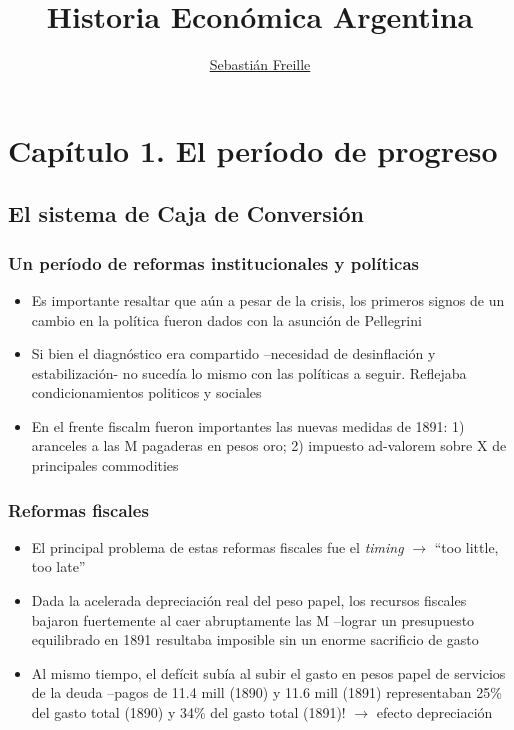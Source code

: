 \documentclass[14pt,aspectratio=169]{beamer}
\title{Historia Económica Argentina}
\author{\underline{Sebastián Freille} \inst{1}}
\institute[shortinst]{\inst{1} IEF-UNC \\ UCC}
\date{}
\begin{document}
{
  \begin{frame}
    \titlepage
  \end{frame}
}

  
  \section{Capítulo 1. El período de progreso}

  \subsection{El sistema de Caja de Conversión}


   \begin{frame}\frametitle{Un período de reformas institucionales y políticas}
    \begin{itemize}\itemsep 10pt
      \item Es importante resaltar que aún a pesar de la crisis, los
        primeros signos de un cambio en la política fueron dados con
        la asunción de Pellegrini
        \item Si bien el diagnóstico era compartido --necesidad de desinflación y
          estabilización- no sucedía lo mismo con las políticas a
          seguir. Reflejaba condicionamientos
          politicos y sociales
        \item En el frente fiscalm fueron
            importantes las nuevas medidas de 1891: 1)
            aranceles a las M pagaderas en pesos oro; 2) impuesto
            ad-valorem sobre X de principales commodities
       \end{itemize}
      \end{frame}


 \begin{frame}\frametitle{Reformas fiscales}
    \begin{itemize}\itemsep 10pt
      \item El principal problema de estas reformas fiscales fue el
        \textit{timing} $\longrightarrow$ ``too little, too late''
        \item Dada la acelerada depreciación real del peso papel, los
          recursos fiscales bajaron fuertemente al caer abruptamente
          las M --lograr un presupuesto equilibrado en 1891 resultaba
          imposible sin un enorme sacrificio de gasto
          \item Al mismo tiempo, el defícit subía al subir el gasto en
            pesos papel de servicios de la deuda --pagos de 11.4 mill
            (1890) y 11.6 mill (1891) representaban 25\% del gasto
            total (1890) y 34\% del gasto total (1891)!
            $\longrightarrow$ efecto depreciación
       \end{itemize}
      \end{frame}
      
\end{document}
